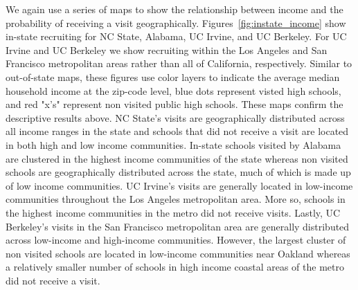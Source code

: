 \documentclass[twoside]{article}
\begin{document}


We again use a series of maps to show the relationship between income and the probability of receiving a visit geographically. Figures~\ref{fig:instate_income} show in-state recruiting for NC State, Alabama, UC Irvine, and UC Berkeley. For UC Irvine and UC Berkeley we show recruiting within the Los Angeles and San Francisco metropolitan areas rather than all of California, respectively. Similar to out-of-state maps, these figures use color layers to indicate the average median household income at the zip-code level, blue dots represent visted high schools, and red "x's" represent non visited public high schools. These maps confirm the descriptive results above. NC State's visits are geographically distributed across all income ranges in the state and schools that did not receive a visit are located in both high and low income communities. In-state schools visited by Alabama are clustered in the highest income communities of the state whereas non visited schools are geographically distributed across the state, much of which is made up of low income communities. UC Irvine's visits are generally located in low-income communities throughout the Los Angeles metropolitan area. More so, schools in the highest income communities in the metro did not receive visits. Lastly, UC Berkeley's visits in the San Francisco metropolitan area are generally distributed across low-income and high-income communities. However, the largest cluster of non visited schools are located in low-income communities near Oakland whereas a relatively smaller number of schools in high income coastal areas of the metro did not receive a visit.
\end{document}
